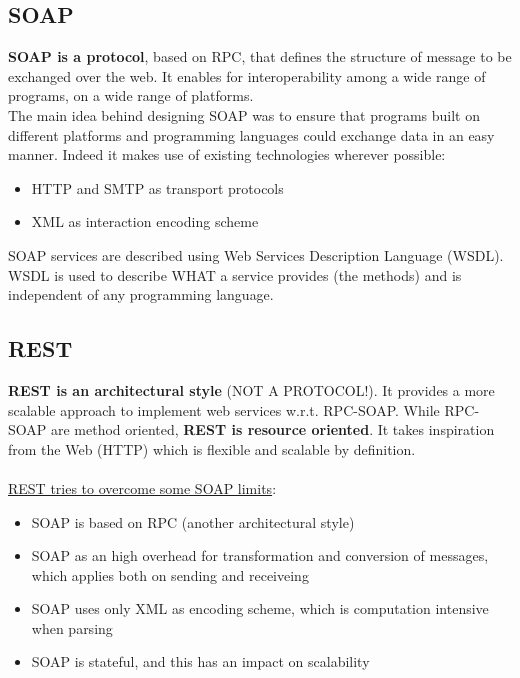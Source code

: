 \documentclass[10pt,a4paper]{article}
\begin{document}
\subsection{SOAP}
\textbf{SOAP is a protocol}, based on RPC, that defines the structure of message to be exchanged over the web. It enables for interoperability among a wide range of programs, on a wide range of platforms.\\
The main idea behind designing SOAP was to ensure that programs built on different platforms and programming languages could exchange data in an easy manner.
Indeed it makes use of existing technologies wherever possible:
\begin{itemize}
	\item HTTP and SMTP as transport protocols
	\item XML as interaction encoding scheme
\end{itemize}
SOAP services are described using Web Services Description Language (WSDL). WSDL is used to describe WHAT a service provides (the methods) and is independent of any programming language.
\subsection{REST}
\textbf{REST is an architectural style} (NOT A PROTOCOL!). It provides a more scalable approach to implement web services w.r.t. RPC-SOAP. While RPC-SOAP are method oriented, \textbf{REST is resource oriented}. It takes inspiration from the Web (HTTP) which is flexible and scalable by definition.
\\ \\ \uline{REST tries to overcome some SOAP limits}:
\begin{itemize}
	\item SOAP is based on RPC (another architectural style)
	\item SOAP as an high overhead for transformation and conversion of messages, which applies both on sending and receiveing
	\item SOAP uses only XML as encoding scheme, which is computation intensive when parsing
	\item SOAP is stateful, and this has an impact on scalability
\end{itemize}
\end{document}

